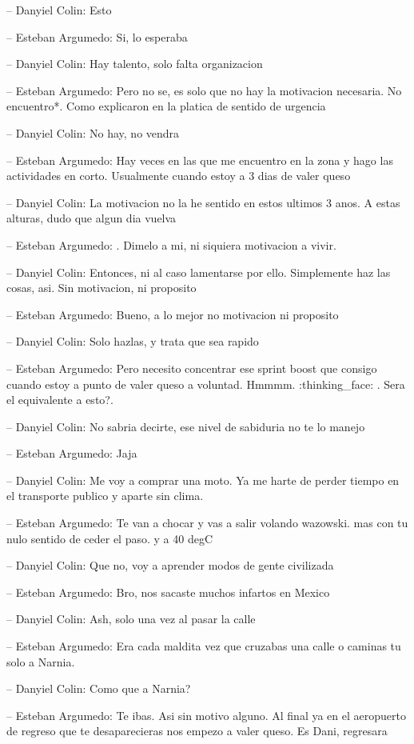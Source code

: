 -- Danyiel Colin: Esto

-- Esteban Argumedo: Si, lo esperaba

-- Danyiel Colin: Hay talento, solo falta organizacion

-- Esteban Argumedo: Pero no se, es solo que no hay la motivacion
necesaria. No encuentro*. Como explicaron en la platica de sentido de
urgencia

-- Danyiel Colin: No hay, no vendra

-- Esteban Argumedo: Hay veces en las que me encuentro en la zona y hago
las actividades en corto. Usualmente cuando estoy a 3 dias de valer
queso

-- Danyiel Colin: La motivacion no la he sentido en estos ultimos 3
anos. A estas alturas, dudo que algun dia vuelva

-- Esteban Argumedo: . Dimelo a mi, ni siquiera motivacion a vivir.

-- Danyiel Colin: Entonces, ni al caso lamentarse por ello. Simplemente
haz las cosas, asi. Sin motivacion, ni proposito

-- Esteban Argumedo: Bueno, a lo mejor no motivacion ni proposito

-- Danyiel Colin: Solo hazlas, y trata que sea rapido

-- Esteban Argumedo: Pero necesito concentrar ese sprint boost que
consigo cuando estoy a punto de valer queso a voluntad. Hmmmm.
:thinking\_face: . Sera el equivalente a esto?.

-- Danyiel Colin: No sabria decirte, ese nivel de sabiduria no te lo
manejo

-- Esteban Argumedo: Jaja

-- Danyiel Colin: Me voy a comprar una moto. Ya me harte de perder
tiempo en el transporte publico y aparte sin clima.

-- Esteban Argumedo: Te van a chocar y vas a salir volando wazowski. mas
con tu nulo sentido de ceder el paso. y a 40 degC

-- Danyiel Colin: Que no, voy a aprender modos de gente civilizada

-- Esteban Argumedo: Bro, nos sacaste muchos infartos en Mexico

-- Danyiel Colin: Ash, solo una vez al pasar la calle

-- Esteban Argumedo: Era cada maldita vez que cruzabas una calle o
caminas tu solo a Narnia.

-- Danyiel Colin: Como que a Narnia?

-- Esteban Argumedo: Te ibas. Asi sin motivo alguno. Al final ya en el
aeropuerto de regreso que te desaparecieras nos empezo a valer queso. Es
Dani, regresara

